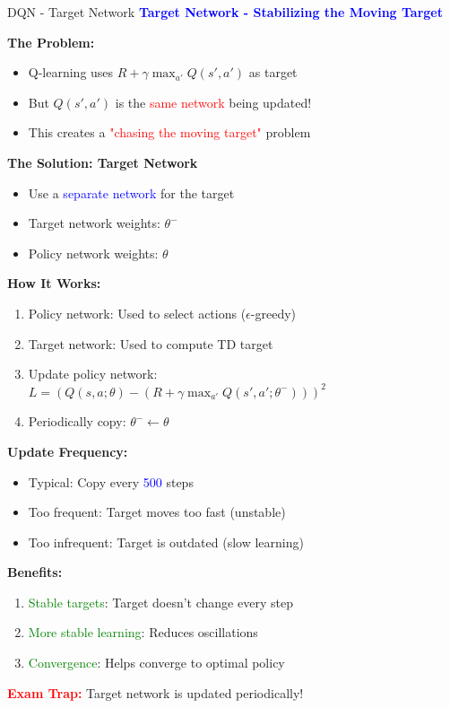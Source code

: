 \documentclass[8pt]{beamer}
\begin{document}
\begin{frame}{DQN - Target Network}
\fontsize{6.5}{7.5}\selectfont
\textcolor{blue}{\textbf{Target Network - Stabilizing the Moving Target}}

\textbf{The Problem:}
\begin{itemize}
\item Q-learning uses $R + \gamma \max_{a'} Q(s',a')$ as target
\item But $Q(s',a')$ is the \textcolor{red}{same network} being updated!
\item This creates a \textcolor{red}{"chasing the moving target"} problem
\end{itemize}

\textbf{The Solution: Target Network}
\begin{itemize}
\item Use a \textcolor{blue}{separate network} for the target
\item Target network weights: $\theta^-$
\item Policy network weights: $\theta$
\end{itemize}

\textbf{How It Works:}
\begin{enumerate}
\item Policy network: Used to select actions ($\epsilon$-greedy)
\item Target network: Used to compute TD target
\item Update policy network: $L = (Q(s,a;\theta) - (R + \gamma \max_{a'} Q(s',a';\theta^-)))^2$
\item Periodically copy: $\theta^- \leftarrow \theta$
\end{enumerate}

\textbf{Update Frequency:}
\begin{itemize}
\item Typical: Copy every \textcolor{blue}{500} steps
\item Too frequent: Target moves too fast (unstable)
\item Too infrequent: Target is outdated (slow learning)
\end{itemize}

\textbf{Benefits:}
\begin{enumerate}
\item \textcolor{green}{Stable targets}: Target doesn't change every step
\item \textcolor{green}{More stable learning}: Reduces oscillations
\item \textcolor{green}{Convergence}: Helps converge to optimal policy
\end{enumerate}

\textcolor{red}{\textbf{Exam Trap:}} Target network is updated periodically!
\end{frame}
\end{document}
